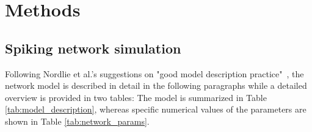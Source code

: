 \section{Methods}
\label{sec:methods}

\subsection{Spiking network simulation}
\label{subsec:methods_simulation}
Following Nordlie et al.'s suggestions on 
"good model description practice"~\cite{nordlie2009},
the network model is described in detail in the following paragraphs while a detailed 
overview is provided in two tables: The model is summarized in Table 
\ref{tab:model_description}, 
whereas specific numerical values of the parameters are shown in Table 
\ref{tab:network_params}. 

